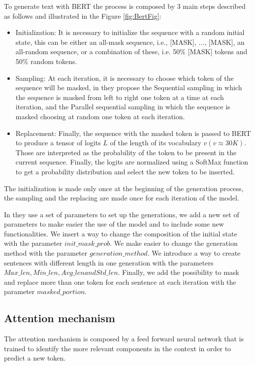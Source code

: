 \documentclass[10pt,twocolumn,letterpaper]{article}
\begin{document}
To generate text with BERT the process is composed by 3 main steps described as follows and illustrated in the Figure \ref{fig:BertFig}:

\begin{itemize}
\item Initialization: It is necessary to initialize the sequence with a random initial state, this can be either an all-mask sequence,
i.e., [MASK], ..., [MASK], an all-random sequence, or a combination of these, i.e. 50\% [MASK] tokens and 50\% random tokens.
\item Sampling: At each iteration, it is necessary to choose which token of the sequence will be masked, in \cite{wang2019bert}
they propose the Sequential sampling in which the sequence is masked from left to right one token at a time at each iteration,
and the Parallel sequential sampling in which the sequence is masked choosing at random one token at each iteration.
\item Replacement: Finally, the sequence with the masked token is passed to BERT to produce a tensor of logits $L$ of
the length of its vocabulary $v (v \approx 30K)$. Those are interpreted as the probability of the token to be present in the current sequence.
Finally, the logits are normalized using a SoftMax function to get a probability distribution and select the new token to be inserted.
\end{itemize}

The initialization is made only once at the beginning of the generation process, the sampling and the replacing are
made once for each iteration of the model.

In \cite{wang2019bert} they use a set of parameters to set up the generations,
we add a new set of parameters to make easier the use of the model and
to include some new functionalities. We insert a way to
change the composition of the initial state with the parameter $init\_mask\_prob$.
We make easier to change the generation method with the parameter $generation\_method$.
We introduce a way to create sentences with different length in one generation with the parameters $Max\_len,
Min\_len, Avg\_len and Std\_len$. Finally, we add the possibility to mask and replace more
than one token for each sentence at each iteration with the parameter $masked\_portion$.

\subsection{Attention mechanism}
The attention mechanism is composed by a feed forward neural network that is trained to
identify the more relevant components in the context in order to predict a new token.
\end{document}
